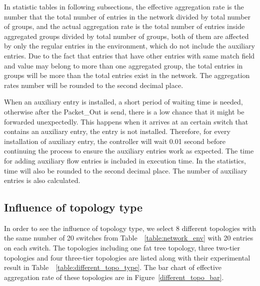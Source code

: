 In statistic tables in following subsections, the effective aggregation rate is the number that the total number of entries in the network divided by total number of groups, and the actual aggregation rate is the total number of entries inside aggregated groups divided by total number of groups, both of them are affected by only the regular entries in the environment, which do not include the auxiliary entries. Due to the fact that entries that have other entries with same match field and value may belong to more than one aggregated group, the total entries in groups will be more than the total entries exist in the network. The aggregation rates number will be rounded to the second decimal place.

When an auxiliary entry is installed, a short period of waiting time is needed, otherwise after the Packet\_Out is send, there is a low chance that it might be forwarded unexpectedly. This happens when it arrives at an certain switch that contains an auxiliary entry, the entry is not installed. Therefore, for every installation of auxiliary entry, the controller will wait 0.01 second before continuing the process to ensure the auxiliary entries work as expected. The time for adding auxiliary flow entries is included in execution time. In the statistics, time will also be rounded to the second decimal place. The number of auxiliary entries is also calculated.

\subsection{Influence of topology type}
In order to see the influence of topology type, we select 8 different topologies with the same number of 20 switches from Table~~\ref{table:network_env} with 20 entries on each switch. The topologies including one fat tree topology, three two-tier topologies and four three-tier topologies are listed along with their experimental result in Table~~\ref{table:different_topo_type}. The bar chart of effective aggregation rate of these topologies are in Figure~\ref{different_topo_bar}.

